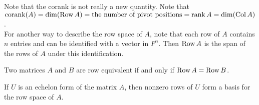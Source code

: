 Note that the corank is not really a new quantity. Note that $\operatorname*{corank}(A) = \dim(\operatorname*{Row} A) = \text{the number of pivot positions} = \operatorname*{rank} A = \dim(\operatorname{Col} A)$.\\

For another way to describe the row space of $A$, note that each row of $A$ contains $n$ entries and can be identified with a vector in $F^n$. Then $\operatorname*{Row} A$ is the span of the rows of $A$ under this identification.\\

\begin{Thm}\label{thm:rowspaceequivalence} Two matrices $A$ and $B$ are row equivalent if and only if $\operatorname*{Row} A = \operatorname*{Row} B$.
\end{Thm}\vs

\begin{Thm}\label{thm:rowspaceequivalencerref} If $U$ is an echelon form of the matrix $A$, then nonzero rows of $U$ form a basis for the row space of $A$.
\end{Thm}\vs

